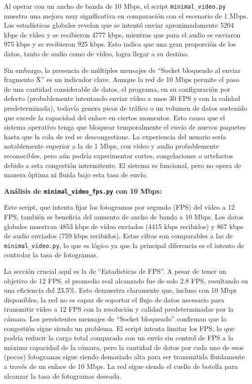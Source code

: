 Al operar con un ancho de banda de 10 Mbps, el script \texttt{minimal\_video.py} muestra una mejora muy significativa en comparación con el escenario de 1 Mbps. Las estadísticas globales revelan que se intentó enviar aproximadamente 5204 kbps de vídeo y se recibieron 4777 kbps, mientras que para el audio se enviaron 975 kbps y se recibieron 925 kbps. Esto indica que una gran proporción de los datos, tanto de audio como de vídeo, logra llegar a su destino.

Sin embargo, la presencia de múltiples mensajes de ``Socket bloqueado al enviar fragmento X'' es un indicador clave. Aunque la red de 10 Mbps permite el paso de una cantidad considerable de datos, el programa, en su configuración por defecto (probablemente intentando enviar vídeo a unos 30 FPS y con la calidad predeterminada), todavía genera picos de tráfico o un volumen de datos sostenido que excede la capacidad del enlace en ciertos momentos. Esto causa que el sistema operativo tenga que bloquear temporalmente el envío de nuevos paquetes hasta que la cola de red se descongestione. La experiencia del usuario sería notablemente superior a la de 1 Mbps, con vídeo y audio probablemente reconocibles, pero aún podría experimentar cortes, congelaciones o artefactos debido a esta congestión intermitente. El sistema es funcional, pero no opera de manera óptima ni fluida bajo esta tasa de envío.

\vspace{\baselineskip}

\textbf{Análisis de \texttt{minimal\_video\_fps.py} con 10 Mbps:}

Este script, que intenta fijar los fotogramas por segundo (FPS) del vídeo a 12 FPS, también se beneficia del aumento de ancho de banda a 10 Mbps. Los datos globales muestran 4853 kbps de vídeo enviados (4415 kbps recibidos) y 867 kbps de audio enviados (759 kbps recibidos). Estas cifras son comparables a las de \texttt{minimal\_video.py}, lo que es lógico ya que la principal diferencia es el intento de controlar la tasa de fotogramas.

La sección crucial aquí es la de ``Estadisticas de FPS''. A pesar de tener un objetivo de 12 FPS, el promedio real alcanzado fue de solo 2.8 FPS, resultando en una eficiencia del 23.5\%. Esto demuestra claramente que, incluso con 10 Mbps disponibles, la red no es capaz de soportar el flujo de datos necesario para transmitir vídeo a 12 FPS con la resolución y calidad predeterminadas por la cámara. Los persistentes mensajes de ``Socket bloqueado'' confirman que la congestión sigue siendo un problema. El script intenta limitar los FPS, lo que podría reducir la carga total comparado con un envío sin control de FPS a la máxima capacidad de la cámara, pero la cantidad de datos por cada uno de esos (pocos) fotogramas sigue siendo demasiado alta para ser transmitida fluidamente a través de un enlace de 10 Mbps. La red sigue siendo el cuello de botella para alcanzar la tasa de fotogramas deseada.

